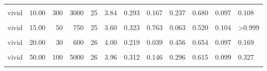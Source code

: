 \documentclass[
]{article}
\begin{document}
\begin{longtable}[t]{lrrrrrrlrrrl}
\hspace{1em}\cellcolor{gray!10}{vivid} & \cellcolor{gray!10}{10.00} & \cellcolor{gray!10}{40} & \cellcolor{gray!10}{400} & \cellcolor{gray!10}{26} & \cellcolor{gray!10}{3.62} & \cellcolor{gray!10}{0.260} & \cellcolor{gray!10}{0.649} & \cellcolor{gray!10}{0.089} & \cellcolor{gray!10}{0.577} & \cellcolor{gray!10}{0.101} & \cellcolor{gray!10}{0.557}\\
\hspace{1em}vivid & 10.00 & 300 & 3000 & 25 & 3.84 & 0.293 & 0.167 & 0.237 & 0.680 & 0.097 & 0.108\\
\hspace{1em}\cellcolor{gray!10}{vivid} & \cellcolor{gray!10}{15.00} & \cellcolor{gray!10}{20} & \cellcolor{gray!10}{300} & \cellcolor{gray!10}{26} & \cellcolor{gray!10}{3.42} & \cellcolor{gray!10}{0.300} & \cellcolor{gray!10}{0.918} & \cellcolor{gray!10}{-0.051} & \cellcolor{gray!10}{0.577} & \cellcolor{gray!10}{0.101} & \cellcolor{gray!10}{0.557}\\
\hspace{1em}vivid & 15.00 & 50 & 750 & 25 & 3.60 & 0.323 & 0.763 & 0.063 & 0.520 & 0.104 & >0.999\\
\hspace{1em}\cellcolor{gray!10}{vivid} & \cellcolor{gray!10}{20.00} & \cellcolor{gray!10}{10} & \cellcolor{gray!10}{200} & \cellcolor{gray!10}{24} & \cellcolor{gray!10}{3.58} & \cellcolor{gray!10}{0.274} & \cellcolor{gray!10}{0.630} & \cellcolor{gray!10}{0.063} & \cellcolor{gray!10}{0.625} & \cellcolor{gray!10}{0.103} & \cellcolor{gray!10}{0.307}\\
\hspace{1em}vivid & 20.00 & 30 & 600 & 26 & 4.00 & 0.219 & 0.039 & 0.456 & 0.654 & 0.097 & 0.169\\
\hspace{1em}\cellcolor{gray!10}{vivid} & \cellcolor{gray!10}{50.00} & \cellcolor{gray!10}{10} & \cellcolor{gray!10}{500} & \cellcolor{gray!10}{25} & \cellcolor{gray!10}{3.80} & \cellcolor{gray!10}{0.289} & \cellcolor{gray!10}{0.153} & \cellcolor{gray!10}{0.212} & \cellcolor{gray!10}{0.760} & \cellcolor{gray!10}{0.089} & \cellcolor{gray!10}{0.015}\\
\hspace{1em}vivid & 50.00 & 100 & 5000 & 26 & 3.96 & 0.312 & 0.146 & 0.296 & 0.615 & 0.099 & 0.327\\
\hspace{1em}\cellcolor{gray!10}{vivid} & \cellcolor{gray!10}{100.00} & \cellcolor{gray!10}{30} & \cellcolor{gray!10}{3000} & \cellcolor{gray!10}{25} & \cellcolor{gray!10}{3.80} & \cellcolor{gray!10}{0.257} & \cellcolor{gray!10}{0.133} & \cellcolor{gray!10}{0.238} & \cellcolor{gray!10}{0.720} & \cellcolor{gray!10}{0.094} & \cellcolor{gray!10}{0.043}\\

\end{longtable}
\end{document}
